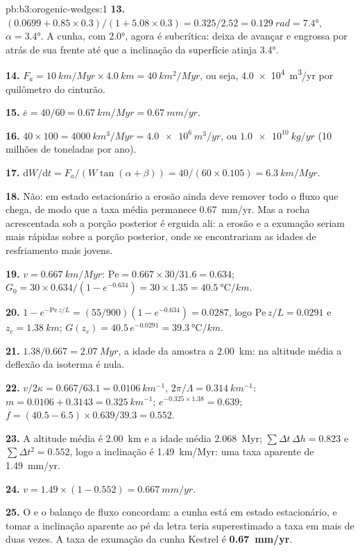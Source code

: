 \begin{solution}{pb:b3:orogenic-wedges:1}
\textbf{13.} $(0.0699 + 0.85\times0.3)/(1 + 5.08\times0.3) = 0.325/2.52 =
\qty{0.129}{rad} = \ang{7.4}$, $\alpha = \ang{3.4}$. A cunha, com \ang{2.0},
agora é subcrítica: deixa de avançar e engrossa por  atrás de sua frente até que a inclinação da superfície atinja \ang{3.4}.

\textbf{14.} $F_a = \qty{10}{km/Myr}\times\qty{4.0}{km} = \qty{40}{km^2/Myr}$,
ou seja, \qty{4.0e4}{m^3/yr} por quilômetro do cinturão.

\textbf{15.} $\bar e = 40/60 = \qty{0.67}{km/Myr} = \qty{0.67}{mm/yr}$.

\textbf{16.} $40\times100 = \qty{4000}{km^3/Myr} = \qty{4.0e6}{m^3/yr}$, ou
$\qty{1.0e10}{kg/yr}$ (10 milhões de toneladas por ano).

\textbf{17.} $\mathrm dW/\mathrm dt = F_a/(W\tan(\alpha + \beta)) =
40/(60\times0.105) = \qty{6.3}{km/Myr}$.

\textbf{18.} Não: em estado estacionário a erosão ainda deve remover todo o
fluxo que chega, de modo que a taxa média permanece \qty{0.67}{mm/yr}. Mas a rocha acrescentada
sob a porção posterior é erguida ali: a erosão e a exumação seriam mais rápidas
sobre a porção posterior, onde se encontrariam as idades de resfriamento mais jovens.

\textbf{19.} $v = \qty{0.667}{km/Myr}$: $\mathrm{Pe} = 0.667\times30/31.6 =
0.634$; $G_0 = 30\times0.634/(1 - e^{-0.634}) = 30\times1.35 =
\qty{40.5}{\celsius/km}$.

\textbf{20.} $1 - e^{-\mathrm{Pe}\,z/L} = (55/900)(1 - e^{-0.634}) = 0.0287$,
logo $\mathrm{Pe}\,z/L = 0.0291$ e $z_c = \qty{1.38}{km}$; $G(z_c) =
40.5\,e^{-0.0291} = \qty{39.3}{\celsius/km}$.

\textbf{21.} $1.38/0.667 = \qty{2.07}{Myr}$, a idade da amostra a
\qty{2.00}{km}: na altitude média a deflexão da isoterma é nula.

\textbf{22.} $v/2\kappa = 0.667/63.1 = \qty{0.0106}{km^{-1}}$, $2\pi/\Lambda =
\qty{0.314}{km^{-1}}$: $m = 0.0106 + 0.3143 = \qty{0.325}{km^{-1}}$;
$e^{-0.325\times1.38} = 0.639$; $f = (40.5 - 6.5)\times0.639/39.3 = 0.552$.

\textbf{23.} A altitude média é \qty{2.00}{km} e a idade média
\qty{2.068}{Myr}; $\sum\Delta t\,\Delta h = 0.823$ e $\sum\Delta t^2 =
0.552$, logo a inclinação é \qty{1.49}{km/Myr}: uma taxa aparente de
\qty{1.49}{mm/yr}.

\textbf{24.} $v = 1.49\times(1 - 0.552) = \qty{0.667}{mm/yr}$.

\textbf{25.} O  e o balanço de fluxo concordam: a cunha está
em estado estacionário, e tomar a inclinação aparente ao pé da letra teria
superestimado a taxa em mais de duas vezes. A taxa de exumação da cunha Kestrel
é \textbf{\qty[text-series-to-math=true]{0.67}{mm/yr}}.
\end{solution}
